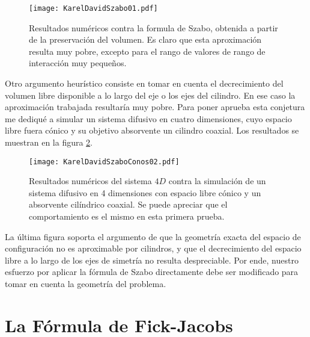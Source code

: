 \documentclass[letterpaperr,12pt]{article}
\begin{document}
\begin{figure}[h]
  \centering
   \texttt{[image: KarelDavidSzabo01.pdf]}
   \caption{Resultados numéricos contra la formula de Szabo, obtenida
a partir de la preservación del volumen. Es claro que esta
aproximación resulta muy pobre, excepto para el rango de valores
de rango de interacción muy pequeños. }\label{Resultados01}
\end{figure}

Otro argumento heurístico consiste en tomar en cuenta el decrecimiento 
del volumen libre disponible a lo largo del eje o los ejes del
cilindro. En ese caso la aproximación trabajada resultaría muy pobre.
Para poner aprueba esta conjetura me dediqué a simular un sistema
difusivo en cuatro dimensiones, cuyo espacio libre fuera cónico y 
su objetivo absorvente un cilindro coaxial. Los resultados se
muestran en la figura \ref{Conos01}.

\begin{figure}[h]
  \centering
   \texttt{[image: KarelDavidSzaboConos02.pdf]}
   \caption{Resultados numéricos del sistema $4D$ contra la 
simulación de un sistema difusivo en 4 dimensiones con espacio
libre cónico y un absorvente cilíndrico coaxial. Se puede
apreciar que el comportamiento es el mismo en esta primera prueba.
 }\label{Conos01}
\end{figure}

La última figura soporta el argumento de que la geometría
exacta del espacio de configuración no es aproximable por cilindros,
y que el decrecimiento del espacio libre a lo largo de los ejes
de simetría no resulta despreciable. Por ende, nuestro esfuerzo
por aplicar la fórmula de Szabo directamente debe ser modificado para
tomar en cuenta la geometría del problema.

\section{La Fórmula de Fick-Jacobs}
\end{document}
